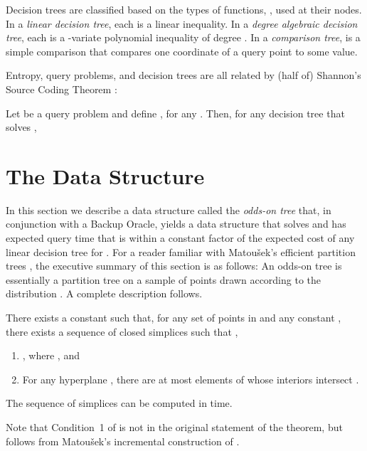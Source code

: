 \documentclass{patmorin}
\begin{document}
Decision trees are classified based on the types of functions, ,
used at their nodes.  In a \emph{linear decision tree}, each  is
a linear inequality.  In a \emph{degree  algebraic decision tree},
each  is a -variate polynomial inequality of degree .  In a
\emph{comparison tree},  is a simple comparison that compares one
coordinate of a query point  to some value.

Entropy, query problems, and decision trees are all related by (half of)
Shannon's Source Coding Theorem \cite{s48}:

\begin{thm}[Shannon 1948]
  Let  be a query problem and define
  , for any . Then, for any decision tree  that solves ,
  
\end{thm}


\section{The Data Structure}

In this section we describe a data structure  called
the \emph{odds-on tree} that, in conjunction with a Backup Oracle, yields
a data structure that solves  and has expected query time
that is within a constant factor of the expected cost of any linear
decision tree  for .   For a reader familiar with
Matou\v{s}ek's efficient partition trees \cite{m92},  the executive
summary of this section is as follows: An odds-on tree is essentially
a partition tree on a sample of  points drawn according
to the distribution .  A complete description follows.

\begin{thm}[Matou\v{s}ek 1992]
There exists a constant  such that, for any set  of 
points in  and any constant , there exists a sequence
 of closed simplices such that
,
  \begin{enumerate}
    \item , where , and
    \item For any hyperplane , there are at most  elements of
   whose interiors intersect .
  \end{enumerate}
  The sequence of simplices  can be computed
  in  time.
\end{thm}

Note that Condition~1 of  is not in the original
statement of the theorem, but follows from Matou\v{s}ek's incremental
construction of  \cite{m92}.
\end{document}
